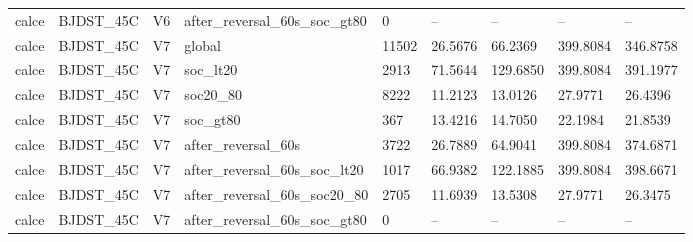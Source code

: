 \begin{tabular}{lllllllll}
calce & BJDST\_45C & V6 & after\_reversal\_60s\_soc\_gt80 & 0 & -- & -- & -- & -- \\
calce & BJDST\_45C & V7 & global & 11502 & 26.5676 & 66.2369 & 399.8084 & 346.8758 \\
calce & BJDST\_45C & V7 & soc\_lt20 & 2913 & 71.5644 & 129.6850 & 399.8084 & 391.1977 \\
calce & BJDST\_45C & V7 & soc20\_80 & 8222 & 11.2123 & 13.0126 & 27.9771 & 26.4396 \\
calce & BJDST\_45C & V7 & soc\_gt80 & 367 & 13.4216 & 14.7050 & 22.1984 & 21.8539 \\
calce & BJDST\_45C & V7 & after\_reversal\_60s & 3722 & 26.7889 & 64.9041 & 399.8084 & 374.6871 \\
calce & BJDST\_45C & V7 & after\_reversal\_60s\_soc\_lt20 & 1017 & 66.9382 & 122.1885 & 399.8084 & 398.6671 \\
calce & BJDST\_45C & V7 & after\_reversal\_60s\_soc20\_80 & 2705 & 11.6939 & 13.5308 & 27.9771 & 26.3475 \\
calce & BJDST\_45C & V7 & after\_reversal\_60s\_soc\_gt80 & 0 & -- & -- & -- & -- \\
\hline
\end{tabular}

